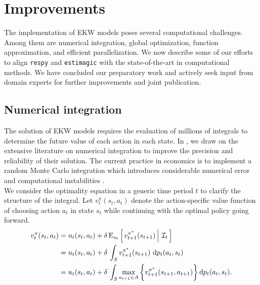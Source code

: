 \section{Improvements}\label{Computation}
The implementation of EKW models poses several computational challenges. Among them are numerical integration, global optimization, function approximation, and efficient parallelization. We now describe some of our efforts to align \verb+respy+ and \verb+estimagic+ with the state-of-the-art in computational methods. We have concluded our preparatory work and actively seek input from domain experts for further improvements and joint publication.
\subsection{Numerical integration}
The solution of EKW models requires the evaluation of millions of integrals to determine the future value of each action in each state. In \citet{Eisenhauer.2020c}, we draw on the extensive literature on numerical integration \citep{Davis.2007, Gerstner.1998} to improve the precision and reliability of their solution. The current practice in economics is to implement a random Monte Carlo integration which introduces considerable numerical error and computational instabilities \citep{Judd.2011}.\\

\noindent We consider the optimality equation in a generic time period $t$ to clarify the structure of the integral. Let $v^{\pi}_{t}(s_t, a_t)$ denote the action-specific value function of choosing action $a_t$ in state $s_t$ while continuing with the optimal policy going forward.
%
\begin{align*}
v^{\pi}_{t}(s_t, a_t) & = u_t(s_t, a_t) + \delta\,\mathrm{E}_{s_t} \left[\left.v^{\pi^*}_{t + 1}(s_{t + 1})\,\right\vert\,\mathcal{I}_t\,\right] \\
& =  u_t(s_t, a_t) + \delta\, \int_S v^{\pi^*}_{t + 1}(s_{t + 1})\, \mathop{}\!\mathrm{d} p_t(a_t, s_t)\\
& =  u_t(s_t, a_t) + \delta\, \int_S \max_{a_{t + 1} \in A}\bigg\{v^{\pi^*}_{t + 1}(s_{t + 1}, a_{t + 1})\bigg\}\mathop{}\!\mathrm{d} p_t(a_t, s_t).
\end{align*}

